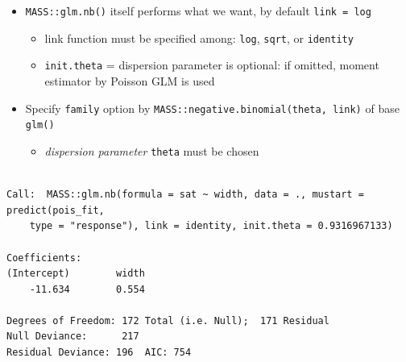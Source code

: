 \documentclass[]{book}
\newenvironment{Shaded}{\begin{snugshade}}{\end{snugshade}}
\newcommand{\DataTypeTok}[1]{\textcolor[rgb]{0.13,0.29,0.53}{#1}}
\newcommand{\FloatTok}[1]{\textcolor[rgb]{0.00,0.00,0.81}{#1}}
\newcommand{\KeywordTok}[1]{\textcolor[rgb]{0.13,0.29,0.53}{\textbf{#1}}}
\newcommand{\NormalTok}[1]{#1}
\newcommand{\OperatorTok}[1]{\textcolor[rgb]{0.81,0.36,0.00}{\textbf{#1}}}
\newcommand{\StringTok}[1]{\textcolor[rgb]{0.31,0.60,0.02}{#1}}
\providecommand{\tightlist}{%
  \setlength{\itemsep}{0pt}\setlength{\parskip}{0pt}}
\begin{document}
\begin{itemize}
\tightlist
\item
  \texttt{MASS::glm.nb()} itself performs what we want, by default \texttt{link\ =\ log}

  \begin{itemize}
  \tightlist
  \item
    link function must be specified among: \texttt{log}, \texttt{sqrt}, or \texttt{identity}
  \item
    \texttt{init.theta} = dispersion parameter is optional: if omitted, moment estimator by Poisson GLM is used
  \end{itemize}
\item
  Specify \texttt{family} option by \texttt{MASS::negative.binomial(theta,\ link)} of base \texttt{glm()}

  \begin{itemize}
  \tightlist
  \item
    \emph{dispersion parameter} \texttt{theta} must be chosen
  \end{itemize}
\end{itemize}

\begin{Shaded}
\end{Shaded}

\begin{verbatim}

Call:  MASS::glm.nb(formula = sat ~ width, data = ., mustart = predict(pois_fit, 
    type = "response"), link = identity, init.theta = 0.9316967133)

Coefficients:
(Intercept)        width  
    -11.634        0.554  

Degrees of Freedom: 172 Total (i.e. Null);  171 Residual
Null Deviance:      217 
Residual Deviance: 196  AIC: 754
\end{verbatim}

\begin{Shaded}
\end{Shaded}
\end{document}
